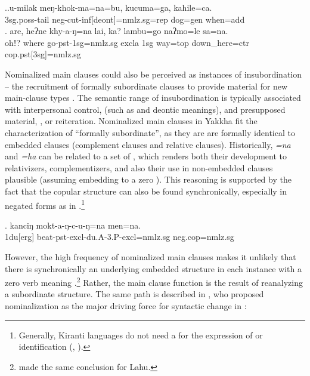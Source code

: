  
\ex.\ag.u-milak          meŋ-khok-ma=na=bu,                       kucuma=ga,   kahile=ca.\\
{\sc 3sg.poss-}tail  {\sc neg-}cut{\sc -inf[deont]=nmlz.sg=rep}  dog{\sc =gen} when{\sc =add}\\
\bg. are,   heʔne khy-a-ŋ=na lai,        ka? lambu=go     naʔmo=le             sa=na.\\
ohǃ?  where  go{\sc -pst-1sg=nmlz.sg} {\sc excla} {\sc 1sg} way{\sc =top} down\_here{\sc =ctr} {\sc cop.pst[3sg]=nmlz.sg}\\



Nominalized main clauses could also be perceived as instances of insubordination – the  recruitment of formally subordinate clauses to provide material for new main-clause types \citep{Evans2007_Insubordination}. The semantic range of insubordination is typically associated with interpersonal control,  (such as  and deontic meanings), and presupposed material, , or reiteration. Nominalized main clauses in Yakkha fit the characterization of “formally subordinate”, as they are are formally identical to embedded clauses (complement clauses and relative clauses). 
Historically,   \emph{=na} and \emph{=ha} can be related to a set of , which renders both their development to relativizers, complementizers, and also their use in  non-embedded  clauses plausible (assuming embedding to a zero ). This reasoning is supported by the fact that the copular structure can also be found synchronically, especially in negated forms as in \Next.\footnote{Generally,  Kiranti languages do not need a  for the expression of  or identification (\citet[276]{Bickel1999Nominalization}, \citealt[105]{Ebert1994The-structure}).}  

 \exg. kanciŋ  mokt-a-ŋ-c-u-ŋ=na  men=na.\\
{\sc 1du[erg]} beat{\sc -pst-excl-du.A-3.P-excl=nmlz.sg} {\sc neg.cop=nmlz.sg}\\
  
 

However, the high frequency of nominalized main clauses makes it unlikely that there is synchronically an underlying embedded structure in each instance with a zero verb meaning .\footnote{\citet{Matisoff1972Lahu} made the same conclusion for Lahu.} Rather, the main clause function is the result of reanalyzing a subordinate structure. The same path is described in \citet{DeLancey2011_Finite}, who proposed nominalization as the major driving force for syntactic change in :\\
 
